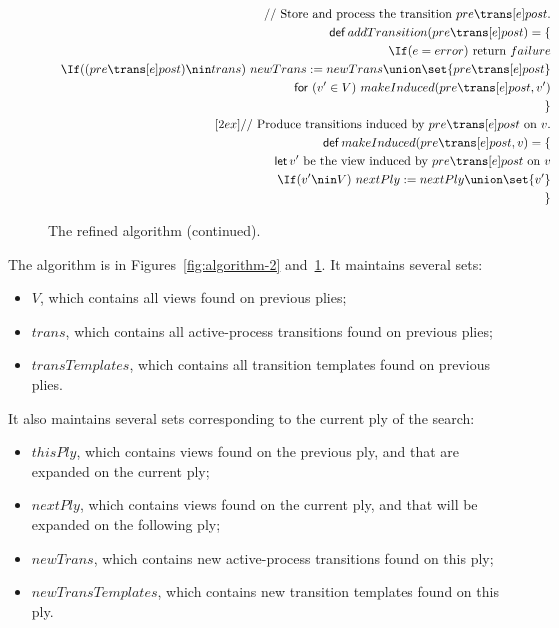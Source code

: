 
\begin{figure}
\[
\begin{align}
\comment{Store and process the transition $pre \trans[e] post$.} \\
\Def addTransition(pre \trans[e] post) = \{ \\
\quad  \If (e = error)\ \mbox{return $failure$} \\
\quad \If ((pre \trans[e] post) \nin trans)\ 
        newTrans := newTrans \union \set{pre \trans[e] post} \\
\quad \For (v' \in V)\ makeInduced(pre \trans[e] post, v') \\
\} 
\\ [2ex]
\comment{Produce transitions induced by $pre \trans[e] post$ on~$v$.} \\
\Def makeInduced(pre \trans[e] post, v) = \{ \\
\quad \Let v' \mbox{ be the view induced by $pre \trans[e] post$ on $v$} \\
\quad \If (v' \nin V)\ nextPly := nextPly \union \set{v'} \\
\} 
\end{align}
\]
\caption{The refined algorithm (continued).}
\label{fig:algorithm-3}
\end{figure}


The algorithm is in Figures~\ref{fig:algorithm-2} and~\ref{fig:algorithm-3}.
It maintains several sets:
%
\begin{itemize}
\item $V$, which contains all views found on previous plies;

\item $trans$, which contains all active-process transitions found on previous
  plies;

\item $transTemplates$, which contains all transition templates found on
  previous plies.
\end{itemize}
%
It also maintains several sets corresponding to the current ply of the search:
%
\begin{itemize}
\item $thisPly$, which contains views found on the previous ply, and that are
  expanded on the current ply;

\item $nextPly$, which contains views found on the current ply, and that will
  be expanded on the following ply;

\item $newTrans$, which contains new active-process transitions found on this
  ply;

\item $newTransTemplates$, which contains new transition templates found on
  this ply.
\end{itemize}

